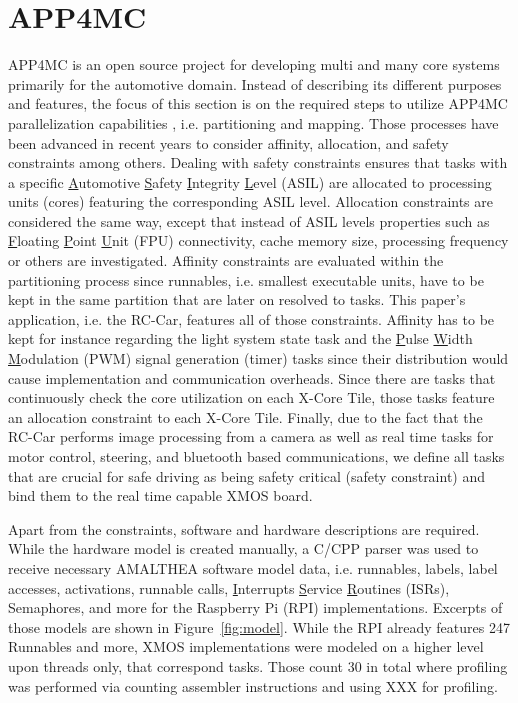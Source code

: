 \documentclass [a4paper,final,conference,10pt]{IDAACS}
\begin{document}
\section{APP4MC}
\label{sec:app4mc}
APP4MC is an open source project for developing multi and many core systems primarily for the automotive domain. Instead of describing its different purposes and features, the focus of this section is on the required steps to utilize APP4MC parallelization capabilities \cite{ICPDSSE}, i.e. partitioning and mapping. Those processes have been advanced in recent years to consider affinity, allocation, and safety constraints among others. Dealing with safety constraints ensures that tasks with a specific \underline{A}utomotive \underline{S}afety \underline{I}ntegrity \underline{L}evel (ASIL) are allocated to processing units (cores) featuring the corresponding ASIL level. Allocation constraints are considered the same way, except that instead of ASIL levels properties such as \underline{F}loating \underline{P}oint \underline{U}nit (FPU) connectivity, cache memory size, processing frequency or others are investigated. Affinity constraints are evaluated within the partitioning process since runnables, i.e. smallest executable units, have to be kept in the same partition that are later on resolved to tasks. This paper's application, i.e. the RC-Car, features all of those constraints. Affinity has to be kept for instance regarding the light system state task and the \underline{P}ulse \underline{W}idth \underline{M}odulation (PWM) signal generation (timer) tasks since their distribution would cause implementation and communication overheads. Since there are tasks that continuously check the core utilization on each X-Core Tile, those tasks feature an allocation constraint to each X-Core Tile. Finally, due to the fact that the RC-Car performs image processing from a camera as well as real time tasks for motor control, steering, and bluetooth based communications, we define all tasks that are crucial for safe driving as being safety critical (safety constraint) and bind them to the real time capable XMOS board. 

Apart from the constraints, software and hardware descriptions are required. While the hardware model is created manually, a C/CPP parser was used to receive necessary AMALTHEA software model data, i.e. runnables, labels, label accesses, activations, runnable calls, \underline{I}nterrupts \underline{S}ervice \underline{R}outines (ISRs), Semaphores, and more for the Raspberry Pi (RPI) implementations. Excerpts of those models are shown in Figure~\ref{fig:model}. While the RPI already features 247 Runnables and more, XMOS implementations were modeled on a higher level upon threads only, that correspond tasks. Those count 30 in total where profiling was performed via counting assembler instructions and using XXX for profiling.
\end{document}
